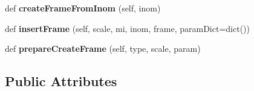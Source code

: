 \begin{DoxyCompactItemize}
def {\bfseries create\+Frame\+From\+Inom} (self, inom)
\item 
\mbox{\label{class_dsg_tools_1_1_factories_1_1_db_factory_1_1abstract_db_1_1_abstract_db_ae0d32a8454a5c0fd7c3f18b306efc88e}} 
def {\bfseries insert\+Frame} (self, scale, mi, inom, frame, param\+Dict=dict())
\item 
\mbox{\label{class_dsg_tools_1_1_factories_1_1_db_factory_1_1abstract_db_1_1_abstract_db_ad1f004de9bd03ee6d40be7310aee0b67}} 
def {\bfseries prepare\+Create\+Frame} (self, type, scale, param)
\end{DoxyCompactItemize}
\subsection*{Public Attributes}

